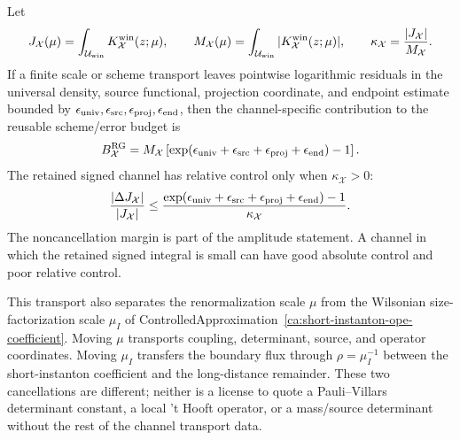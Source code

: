 \begin{controlledapproximation}
Let
\[
  J_{\mathcal X}(\mu)
  =
  \int_{\mathcal U_{\rm win}}K_{\mathcal X}^{\rm win}(z;\mu),
  \qquad
  M_{\mathcal X}(\mu)
  =
  \int_{\mathcal U_{\rm win}}|K_{\mathcal X}^{\rm win}(z;\mu)|,
  \qquad
  \kappa_{\mathcal X}=\frac{|J_{\mathcal X}|}{M_{\mathcal X}} .
\]
If a finite scale or scheme transport leaves pointwise logarithmic residuals in
the universal density, source functional, projection coordinate, and endpoint
estimate bounded by
\(\epsilon_{\rm univ},\epsilon_{\rm src},\epsilon_{\rm proj},\epsilon_{\rm end}\),
then the channel-specific contribution to the reusable scheme/error budget is
\[
  B_{\mathcal X}^{\rm RG}
  =
  M_{\mathcal X}
  \left[
    \exp(\epsilon_{\rm univ}+\epsilon_{\rm src}
      +\epsilon_{\rm proj}+\epsilon_{\rm end})-1
  \right].
\]
The retained signed channel has relative control only when
\(\kappa_{\mathcal X}>0\):
\begin{equation}
  \frac{|\Delta J_{\mathcal X}|}{|J_{\mathcal X}|}
  \le
  \frac{
    \exp(\epsilon_{\rm univ}+\epsilon_{\rm src}
      +\epsilon_{\rm proj}+\epsilon_{\rm end})-1
  }{\kappa_{\mathcal X}} .
  \label{eq:one-instanton-channel-rg-residual-bound}
\end{equation}
The noncancellation margin is part of the amplitude statement.  A channel in
which the retained signed integral is small can have good absolute control
and poor relative control.

This transport also separates the renormalization scale \(\mu\) from the
Wilsonian size-factorization scale \(\mu_I\) of
ControlledApproximation~\ref{ca:short-instanton-ope-coefficient}.  Moving
\(\mu\) transports coupling, determinant, source, and operator coordinates.
Moving \(\mu_I\) transfers the boundary flux through
\(\rho=\mu_I^{-1}\) between the short-instanton coefficient and the
long-distance remainder.  These two cancellations are different; neither is a
license to quote a Pauli--Villars determinant constant, a local 't Hooft
operator, or a mass/source determinant without the rest of the channel
transport data.
\end{controlledapproximation}

